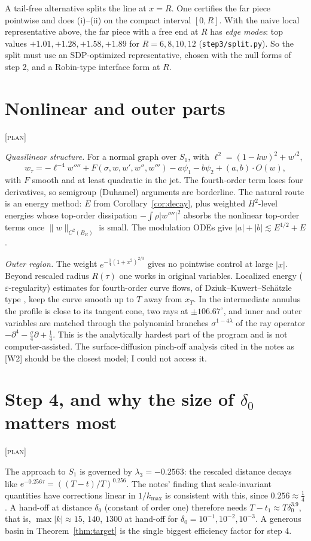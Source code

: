 \documentclass[11pt]{amsart}
\theoremstyle{remark}
\newcommand{\eps}{\varepsilon}
\newcommand{\lab}[1]{\textup{\textsc{[#1]}}}
\begin{document}
A tail-free alternative splits the line at $x=R$. One certifies the far piece pointwise and does (i)--(ii) on the compact interval $[0,R]$. With the naive local representative above, the far piece with a free end at $R$ has \emph{edge modes}: top values $+1.01,+1.28,+1.58,+1.89$ for $R=6,8,10,12$ (\texttt{step3/split.py}). So the split must use an SDP-optimized representative, chosen with the null forms of step 2, and a Robin-type interface form at $R$.

\section{Nonlinear and outer parts}\lab{plan}

\emph{Quasilinear structure.} For a normal graph over $S_1$, with $\ell^2=(1-kw)^2+w'^2$,
\[
w_\tau=-\ell^{-4}w''''+F(\sigma,w,w',w'',w''')-a\psi_1-b\psi_2+(a,b)\cdot O(w),
\]
with $F$ smooth and at least quadratic in the jet. The fourth-order term loses four derivatives, so semigroup (Duhamel) arguments are borderline. The natural route is an energy method: $E$ from Corollary~\ref{cor:decay}, plus weighted $H^2$-level energies whose top-order dissipation $-\int\rho|w''''|^2$ absorbs the nonlinear top-order terms once $\|w\|_{C^2(B_R)}$ is small. The modulation ODEs give $|a|+|b|\lesssim E^{1/2}+E$.

\emph{Outer region.} The weight $e^{-\frac14(1+x^2)^{2/3}}$ gives no pointwise control at large $|x|$. Beyond rescaled radius $R(\tau)$ one works in original variables. Localized energy ($\eps$-regularity) estimates for fourth-order curve flows, of Dziuk--Kuwert--Sch\"atzle type \cite{DKS}, keep the curve smooth up to $T$ away from $x_T$. In the intermediate annulus the profile is close to its tangent cone, two rays at $\pm106.67^\circ$, and inner and outer variables are matched through the polynomial branches $\sigma^{1-4\lambda}$ of the ray operator $-\partial^4-\frac\sigma4\partial+\frac14$. This is the analytically hardest part of the program and is not computer-assisted. The surface-diffusion pinch-off analysis cited in the notes as [W2] should be the closest model; I could not access it.

\section{Step 4, and why the size of $\delta_0$ matters most}\lab{plan}

The approach to $S_1$ is governed by $\lambda_3=-0.2563$: the rescaled distance decays like $e^{-0.256\tau}=((T-t)/T)^{0.256}$. The notes' finding that scale-invariant quantities have corrections linear in $1/k_{\max}$ is consistent with this, since $0.256\approx\frac14$. A hand-off at distance $\delta_0$ (constant of order one) therefore needs $T-t_1\approx T\delta_0^{3.9}$, that is, $\max|k|\approx15$, $140$, $1300$ at hand-off for $\delta_0=10^{-1},10^{-2},10^{-3}$. A generous basin in Theorem~\ref{thm:target} is the single biggest efficiency factor for step 4.
\end{document}
